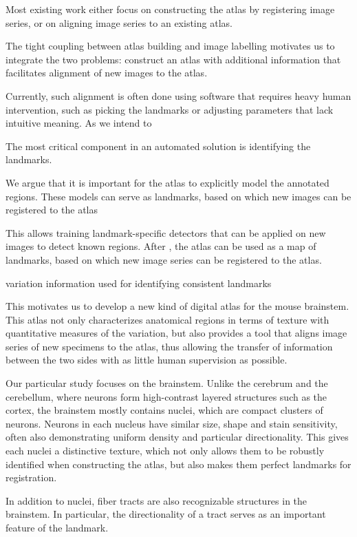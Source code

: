 \documentclass{llncs}
\begin{document}
Most existing work either focus on constructing the atlas by registering image series, or on aligning image series to an existing atlas. 

The tight coupling between atlas building and image labelling motivates us to integrate the two problems: construct an atlas with additional information that facilitates alignment of new images to the atlas.


Currently, such alignment is often done using software that requires heavy human intervention, such as picking the landmarks or adjusting parameters that lack intuitive meaning. As we intend to 

The most critical component in an automated solution is identifying the landmarks.

We argue that it is important for the atlas to explicitly model the annotated regions. These models can serve as landmarks, based on which new images can be registered to the atlas

This allows training landmark-specific detectors that can be applied on new images to detect known regions. After , the atlas can be used as a map of landmarks, based on which new image series can be registered to the atlas.

variation information used for identifying consistent landmarks




This motivates us to develop a new kind of digital atlas for the mouse brainstem. This atlas not only characterizes anatomical regions in terms of texture with quantitative measures of the variation, but also provides a tool that aligns image series of new specimens to the atlas, thus allowing the transfer of information between the two sides with as little human supervision as possible. 

Our particular study focuses on the brainstem. Unlike the cerebrum and the cerebellum, where neurons form high-contrast layered structures such as the cortex, the brainstem mostly contains nuclei, which are compact clusters of neurons. Neurons in each nucleus have similar size, shape and stain sensitivity, often also demonstrating uniform density and particular directionality. This gives each nuclei a distinctive texture, which not only allows them to be robustly identified when constructing the atlas, but also makes them perfect landmarks for registration.

In addition to nuclei, fiber tracts are also recognizable structures in the brainstem. In particular, the directionality of a tract serves as an important feature of the landmark.
\end{document}

